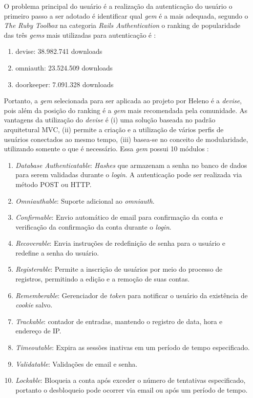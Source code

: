 O problema principal do usuário é a realização da autenticação do usuário o primeiro passo a ser adotado é identificar qual \textit{gem} é a mais adequada, segundo o \textit{The Ruby Toolbox} na categoria \textit{Rails Authentication} o ranking de popularidade das três \textit{gems} mais utilizadas para autenticação é \cite{rubytoolbox}:

\begin{enumerate}
	\item devise: 38.982.741 downloads
	\item omniauth: 23.524.509 downloads
	\item doorkeeper: 7.091.328 downloads
\end{enumerate}

Portanto, a \textit{gem} selecionada para ser aplicada ao projeto por Heleno é a \textit{devise}, pois além da posição do ranking é a \textit{gem} mais recomendada pela comunidade. As vantagens da utilização do \textit{devise} é  (i) uma solução baseada no padrão arquitetural MVC, (ii) permite a criação e a utilização de vários perfis de usuários conectados ao mesmo tempo, (iii) basea-se no conceito de modularidade, utilizando somente o que é necessário. Essa \textit{gem} possui 10 módulos \cite{gemdevise}: 

\begin{enumerate}
	\item \textit{Database Authenticatable}: \textit{Hashes} que armazenam a senha no banco de dados para serem validadas durante o \textit{login}. A autenticação pode ser realizada via método POST ou HTTP. 
	\item \textit{Omniauthable}: Suporte adicional ao \textit{omniauth}.
	\item \textit{Confirmable}: Envio automático de email para confirmação da conta e verificação da confirmação da conta durante o \textit{login}.
	\item \textit{Recoverable}: Envia instruções de redefinição de senha para o usuário e redefine a senha do usuário.
	\item \textit{Registerable}: Permite a inscrição de usuários por meio do processo de registros, permitindo a edição e a remoção de suas contas.
	\item \textit{Rememberable}: Gerenciador de \textit{token} para notificar o usuário da existência de \textit{cookie} salvo.
	\item \textit{Trackable}: contador de entradas, mantendo o registro de data, hora e endereço de IP.
	\item \textit{Timeoutable}: Expira as sessões inativas em um período de tempo especificado. 
	\item \textit{Validatable}: Validações de email e senha. 
	\item \textit{Lockable}: Bloqueia a conta após exceder o número de tentativas especificado, portanto o desbloqueio pode ocorrer via email ou após um período de tempo. 
\end{enumerate}

